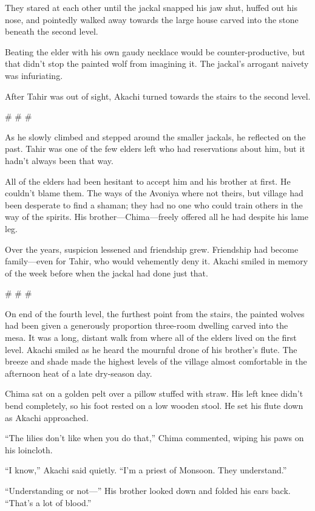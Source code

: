 They stared at each other until the jackal snapped his jaw shut, huffed out his nose, and pointedly walked away towards the large house carved into the stone beneath the second level.

Beating the elder with his own gaudy necklace would be counter-productive, but that didn't stop the painted wolf from imagining it. The jackal's arrogant naivety was infuriating.

After Tahir was out of sight, Akachi turned towards the stairs to the second level.

\# \# \#

As he slowly climbed and stepped around the smaller jackals, he reflected on the past. Tahir was one of the few elders left who had reservations about him, but it hadn't always been that way.

All of the elders had been hesitant to accept him and his brother at first. He couldn't blame them. The ways of the Avoniya where not theirs, but village had been desperate to find a shaman; they had no one who could train others in the way of the spirits. His brother---Chima---freely offered all he had despite his lame leg.

Over the years, suspicion lessened and friendship grew. Friendship had become family---even for Tahir, who would vehemently deny it. Akachi smiled in memory of the week before when the jackal had done just that.

\# \# \#

On end of the fourth level, the furthest point from the stairs, the painted wolves had been given a generously proportion three-room dwelling carved into the mesa. It was a long, distant walk from where all of the elders lived on the first level. Akachi smiled as he heard the mournful drone of his brother's flute. The breeze and shade made the highest levels of the village almost comfortable in the afternoon heat of a late dry-season day.

Chima sat on a golden pelt over a pillow stuffed with straw. His left knee didn't bend completely, so his foot rested on a low wooden stool. He set his flute down as Akachi approached.

``The lilies don't like when you do that,'' Chima commented, wiping his paws on his loincloth.

``I know,'' Akachi said quietly. ``I'm a priest of Monsoon. They understand.''

``Understanding or not---'' His brother looked down and folded his ears back. ``That's a lot of blood.''

